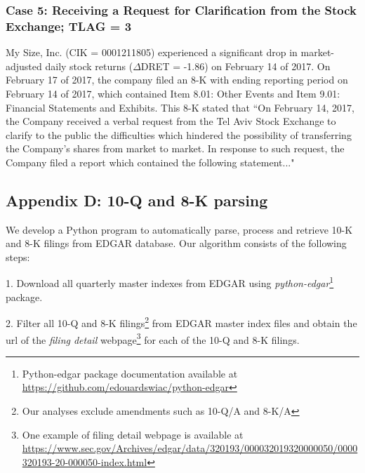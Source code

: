 \subsubsection*{Case 5: Receiving a Request for Clarification from the Stock Exchange; TLAG = 3}
My Size, Inc. (CIK = 0001211805) experienced a significant drop in market-adjusted daily stock returns ($\Delta$DRET = -1.86) on February 14 of 2017. On February 17 of 2017, the company filed an 8-K with ending reporting period on February 14 of 2017, which contained Item 8.01: Other Events and Item 9.01: Financial Statements and Exhibits. This 8-K stated that ``On February 14, 2017, the Company received a verbal request from the Tel Aviv Stock Exchange to clarify to the public the difficulties which hindered the possibility of transferring the Company's shares from market to market. In response to such request, the Company filed a report which contained the following statement..."

\newpage
\subsection*{Appendix D: 10-Q and 8-K parsing}
\setcounter{footnote}{0}
\label{appd}
We develop a Python program to automatically parse, process and retrieve 10-K and 8-K filings from EDGAR database. Our algorithm consists of the following steps:

1. Download all quarterly master indexes from EDGAR using \textit{python-edgar}\footnote{Python-edgar package documentation available at \url{https://github.com/edouardswiac/python-edgar}} package.

2. Filter all 10-Q and 8-K filings\footnote{Our analyses exclude amendments such as 10-Q/A and 8-K/A} from EDGAR master index files and obtain the url of the \textit{filing detail} webpage\footnote{One example of filing detail webpage is available at \url{https://www.sec.gov/Archives/edgar/data/320193/000032019320000050/0000320193-20-000050-index.html}} for each of the 10-Q and 8-K filings. 

